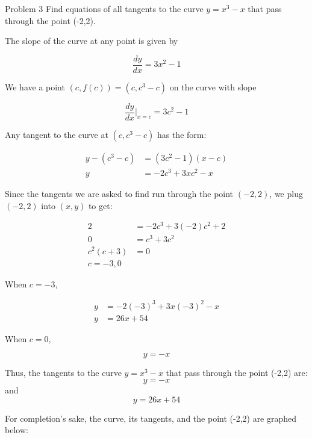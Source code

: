 \documentclass{article}
\begin{document}
    \begin{tbhtheorem}{Problem 3}
        Find equations of all tangents to the curve $y=x^3 - x$ that pass through the point (-2,2).
    \end{tbhtheorem}

    The slope of the curve at any point is given by

    \[
        \frac{dy}{dx} = 3x^2 - 1
    \]

    We have a point $(c,f(c))=(c, c^3 - c)$ on the curve with slope

    \[
        \frac{dy}{dx}\Big|_{x=c} = 3c^2 - 1
    \]

    Any tangent to the curve at $(c,c^3 - c)$ has the form:

    \begin{align*}
        y - (c^3 - c) &= (3c^2 - 1)(x-c) \\
        y             &= -2c^3 + 3xc^2 - x
    \end{align*}

    Since the tangents we are asked to find run through the point $(-2,2)$, we plug $(-2,2)$ into $(x,y)$ to get:

    \begin{align*}
        2   &= -2c^3 + 3(-2)c^2 + 2 \\
        0   &= c^3 + 3c^2 \\
        c^2(c+3)    &= 0 \\
        c = -3,0
    \end{align*}

    When $c=-3$,

    \begin{align*}
        y &= -2(-3)^3 + 3x(-3)^2 - x \\
        y &= 26x + 54
    \end{align*}

    When $c=0$,

    \[
        y = -x
    \]

    Thus, the tangents to the curve $y=x^3-x$ that pass through the point (-2,2) are:
    \[
        y = -x
    \]
    and
    \[
        y = 26x + 54
    \]

    For completion's sake, the curve, its tangents, and the point (-2,2) are graphed below:
\end{document}
